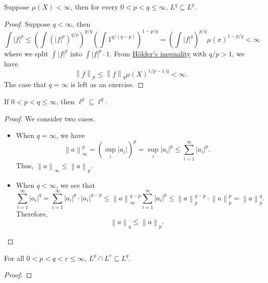\begin{proposition}
	Suppose \(\mu (X)<\infty \), then for every \(0<p<q\leq \infty \), \(L^q\subseteq L^p\).
\end{proposition}
\begin{proof}
	Suppose \(q<\infty \), then
	\[
		\int \left\vert f \right\vert ^p \leq \left(\int \left(\left\vert f \right\vert ^p\right)^{q / p}\right)^{p / q}\left(\int 1^{q/(q-p)}\right)^{1 - p / q}
		= \left(\int \left\vert f \right\vert ^q\right)^{p / q}\mu (x)^{1 - p / q}< \infty
	\]
	where we split \(\int \left\vert f \right\vert ^p\) into \(\int \left\vert f \right\vert ^p\cdot 1\). From \hyperref[thm:Holder-inequality]{Hölder's inequality}
	with \(q / p > 1\), we have
	\[
		\left\lVert f\right\rVert _p \leq \left\lVert f\right\rVert _q \mu (X)^{1 / p - 1 / q}< \infty .
	\]
	The case that \(q = \infty \) is left as an exercise.
\end{proof}

\begin{proposition}
	If \(0<p<q\leq \infty \), then \(\ell ^p\subseteq \ell ^q\).
\end{proposition}
\begin{proof}
	We consider two cases.
	\begin{itemize}
		\item When \(q = \infty \), we have
		      \[
			      \left\lVert a\right\rVert ^p_\infty = \left(\sup _i \left\vert a_{i}  \right\vert \right)^p = \sup _i \left\vert a_{i}  \right\vert ^p \leq \sum\limits_{i=1}^{\infty} \left\vert a_{i}  \right\vert ^p.
		      \]
		      Thus, \(\left\lVert a\right\rVert _\infty \leq \left\lVert a\right\rVert _p\).
		\item When \(q<\infty \), we see that
		      \[
			      \sum\limits_{i=1}^{\infty}\left\vert a_{i}  \right\vert  ^q
			      = \sum\limits_{i=1}^{\infty} \left\vert a_{i}  \right\vert ^p \cdot \left\vert a_{i}  \right\vert ^{q - p}
			      \leq \left\lVert a\right\rVert _\infty ^{q-p}\sum\limits_{i=1}^{\infty} \left\vert a_{i}  \right\vert ^p
			      \leq \left\lVert a\right\rVert _p^{q-p} \cdot \left\lVert a\right\rVert _p^p = \left\lVert a\right\rVert ^q_p.
		      \]
		      Therefore,
		      \[
			      \left\lVert a\right\rVert _q\leq \left\lVert a\right\rVert _p.
		      \]
	\end{itemize}
\end{proof}

\begin{proposition}
	For all \(0<p<q<r\leq \infty \), \(L^p \cap L^{r} \subseteq L^q \).
\end{proposition}
\begin{proof}
\end{proof}

